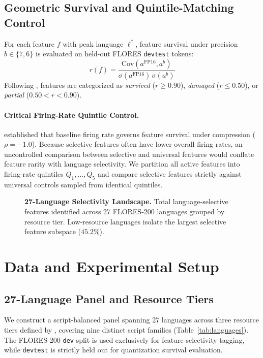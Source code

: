 \documentclass[11pt]{article}
\newcommand{\TODO}[1]{\textbf{\textcolor{red}{[[#1]]}}}
\begin{document}
\subsection{Geometric Survival and Quintile-Matching Control}
For each feature $f$ with peak language $\ell^*$, feature survival under precision $b \in \{7, 6\}$ is evaluated on held-out FLORES \texttt{devtest} tokens:
\begin{equation}
\label{eq:pearson}
r(f) = \frac{\mathrm{Cov}(a^{\text{FP16}}, a^b)}{\sigma(a^{\text{FP16}})\,\sigma(a^b)}
\end{equation}
Following \citet{duan2026perplexity}, features are categorized as \emph{survived} ($r \ge 0.90$), \emph{damaged} ($r \le 0.50$), or \emph{partial} ($0.50 < r < 0.90$).

\paragraph{Critical Firing-Rate Quintile Control.}
\citet{borobia2026how} established that baseline firing rate governs feature survival under compression ($\rho = -1.0$). Because selective features often have lower overall firing rates, an uncontrolled comparison between selective and universal features would conflate feature rarity with language selectivity. We partition all active features into firing-rate quintiles $Q_1, \dots, Q_5$ and compare selective features strictly against universal controls sampled from identical quintiles.

\begin{figure}[t]
\centering
\fbox{\parbox[c][5cm][c]{0.9\linewidth}{\centering\TODO{fig:populations}}}
\caption{\textbf{27-Language Selectivity Landscape.} Total language-selective features identified across 27 FLORES-200 languages grouped by resource tier. Low-resource languages isolate the largest selective feature subspace ($45.2\%$).}
\label{fig:populations}
\end{figure}

\section{Data and Experimental Setup}

\subsection{27-Language Panel and Resource Tiers}
We construct a script-balanced panel spanning 27 languages across three resource tiers defined by \citet{joshi2020state}, covering nine distinct script families (Table~\ref{tab:languages}). The FLORES-200 \texttt{dev} split is used exclusively for feature selectivity tagging, while \texttt{devtest} is strictly held out for quantization survival evaluation.
\end{document}
